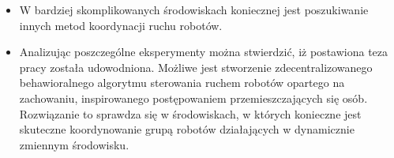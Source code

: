 \begin{frame}
{\begin{itemize}
	\item W bardziej skomplikowanych środowiskach koniecznej jest poszukiwanie innych metod koordynacji ruchu robotów.
	
	\item Analizując poszczególne eksperymenty można stwierdzić, iż postawiona teza pracy została udowodniona. Możliwe jest stworzenie zdecentralizowanego behawioralnego algorytmu sterowania ruchem robotów opartego na zachowaniu, inspirowanego postępowaniem przemieszczających się osób. Rozwiązanie to sprawdza się w środowiskach, w których konieczne jest skuteczne koordynowanie grupą robotów działających w dynamicznie zmiennym środowisku.
	
\end{itemize}	
}
\end{frame}
	


%
%
%	

